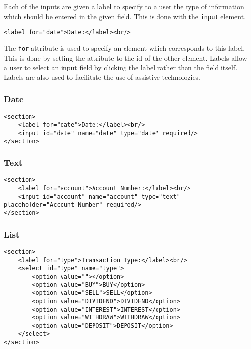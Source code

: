 \documentclass[letterpaper]{article}
\begin{document}
Each of the inputs are given a label to specify to a user the type of information which should be entered in the given field.
This is done with the \lstinline{input} element.

\begin{lstlisting}[firstnumber=12]
<label for="date">Date:</label><br/>
\end{lstlisting}

The \lstinline{for} attribute is used to specify an element which corresponds to this label.
This is done by setting the attribute to the id of the other element.
Labels allow a user to select an input field by clicking the label rather than the field itself.
Labels are also used to facilitate the use of assistive technologies.

\subsubsection{Date}

\begin{lstlisting}[firstnumber=11]
<section>
    <label for="date">Date:</label><br/>
    <input id="date" name="date" type="date" required/>
</section>
\end{lstlisting}

\subsubsection{Text}

\begin{lstlisting}[firstnumber=16]
<section>
    <label for="account">Account Number:</label><br/>
    <input id="account" name="account" type="text" placeholder="Account Number" required/>
</section>
\end{lstlisting}

\subsubsection{List}

\begin{lstlisting}[firstnumber=21]
<section>
    <label for="type">Transaction Type:</label><br/>
    <select id="type" name="type">
        <option value=""></option>
        <option value="BUY">BUY</option>
        <option value="SELL">SELL</option>
        <option value="DIVIDEND">DIVIDEND</option>
        <option value="INTEREST">INTEREST</option>
        <option value="WITHDRAW">WITHDRAW</option>
        <option value="DEPOSIT">DEPOSIT</option>
    </select>
</section>
\end{lstlisting}
\end{document}
